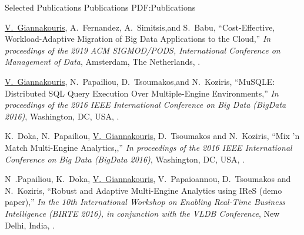 
\Section
{Selected Publications}
{Publications}
{PDF:Publications}

\begingroup
\renewcommand{\MaxNumberedItem}{[8888]}

\BigGap
\Gap
\NumberedItem{[1]}
{\underline{V.~Giannakouris}, A.~Fernandez, A.~Simitsis,and S.~Babu,
	``Cost-Effective, Workload-Adaptive Migration of Big Data Applications to the Cloud,'' \textit{In proceedings of the 2019 ACM SIGMOD/PODS, International Conference on Management of Data},
	Amsterdam, The Netherlands,
	.}

\NumberedItem{[2]}
{\underline{V.~Giannakouris}, N.~Papailiou, D.~Tsoumakos,and N.~Koziris,
	``MuSQLE: Distributed SQL Query Execution Over Multiple-Engine Environments,'' \textit{In proceedings of the 2016 IEEE International Conference on Big Data (BigData 2016)},
	Washington, DC, USA,
	.}

\NumberedItem{[3]}
{K.~Doka, N.~Papailiou, \underline{V.~Giannakouris}, D.~Tsoumakos and N.~Koziris,
``Mix 'n Match Multi-Engine Analytics,,'' \textit{In proceedings of the 2016 IEEE International Conference on Big Data (BigData 2016)},
Washington, DC, USA,
.}


\NumberedItem{[5]}
{N~.Papailiou, K.~Doka, \underline{V.~Giannakouris}, V.~Papaioannou, D.~Tsoumakos and N.~Koziris,
	``Robust and Adaptive Multi-Engine Analytics using IReS (demo paper),'' \textit{In the 10th International Workshop on Enabling Real-Time Business Intelligence (BIRTE 2016), in conjunction with the VLDB Conference},
	New Delhi, India,
	.}

\endgroup